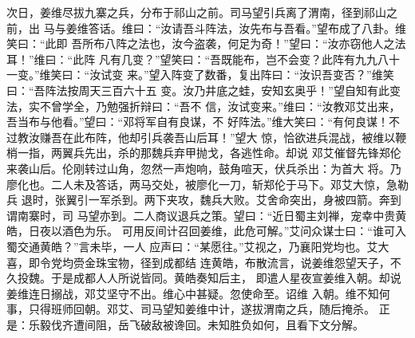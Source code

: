 次日，姜维尽拔九寨之兵，分布于祁山之前。司马望引兵离了渭南，径到祁山之前，出
马与姜维答话。维曰：“汝请吾斗阵法，汝先布与吾看。”望布成了八卦。维笑曰：“此即
吾所布八阵之法也，汝今盗袭，何足为奇！”望曰：“汝亦窃他人之法耳！”维曰：“此阵
凡有几变？”望笑曰：“吾既能布，岂不会变？此阵有九九八十一变。”维笑曰：“汝试变
来。”望入阵变了数番，复出阵曰：“汝识吾变否？”维笑曰：“吾阵法按周天三百六十五
变。汝乃井底之蛙，安知玄奥乎！”望自知有此变法，实不曾学全，乃勉强折辩曰：“吾不
信，汝试变来。”维曰：“汝教邓艾出来，吾当布与他看。”望曰：“邓将军自有良谋，不
好阵法。”维大笑曰：“有何良谋！不过教汝赚吾在此布阵，他却引兵袭吾山后耳！”望大
惊，恰欲进兵混战，被维以鞭梢一指，两翼兵先出，杀的那魏兵弃甲抛戈，各逃性命。却说
邓艾催督先锋郑伦来袭山后。伦刚转过山角，忽然一声炮响，鼓角喧天，伏兵杀出：为首大
将。乃廖化也。二人未及答话，两马交处，被廖化一刀，斩郑伦于马下。邓艾大惊，急勒兵
退时，张翼引一军杀到。两下夹攻，魏兵大败。艾舍命突出，身被四箭。奔到谓南寨时，司
马望亦到。二人商议退兵之策。望曰：“近日蜀主刘禅，宠幸中贵黄皓，日夜以酒色为乐。
可用反间计召回姜维，此危可解。”艾问众谋士曰：“谁可入蜀交通黄皓？”言未毕，一人
应声曰：“某愿往。”艾视之，乃襄阳党均也。艾大喜，即令党均赍金珠宝物，径到成都结
连黄皓，布散流言，说姜维怨望天子，不久投魏。于是成都人人所说皆同。黄皓奏知后主，
即遣人星夜宣姜维入朝。却说姜维连日搦战，邓艾坚守不出。维心中甚疑。忽使命至。诏维
入朝。维不知何事，只得班师回朝。邓艾、司马望知姜维中计，遂拔渭南之兵，随后掩杀。
正是：乐毅伐齐遭间阻，岳飞破敌被谗回。未知胜负如何，且看下文分解。